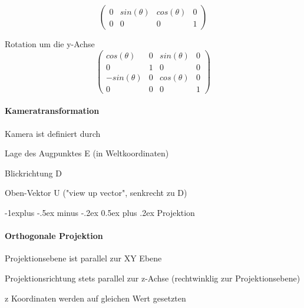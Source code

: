 \documentclass[landscape]{article}
\makeatletter
\renewcommand{\subsection}{\@startsection{subsection}{2}{0mm}%
                                {-1explus -.5ex minus -.2ex}%
                                {0.5ex plus .2ex}%
                                {\normalfont\normalsize\bfseries}}
\makeatother
\begin{document}
\begin{multicols}{3}
\begin{itemize*}
$$\begin{pmatrix}
              0 & sin(\theta) & cos(\theta)  & 0 \\
              0 & 0           & 0            & 1
            \end{pmatrix}$$
    \item Rotation um die y-Achse
          $$\begin{pmatrix}
              cos(\theta)  & 0 & sin(\theta) & 0 \\
              0            & 1 & 0           & 0 \\ 
              -sin(\theta) & 0 & cos(\theta) & 0 \\
              0            & 0 & 0           & 1
            \end{pmatrix}$$
  \end{itemize*}
  
  \paragraph{Kameratransformation}
  Kamera ist definiert durch
  \begin{itemize*}
    \item Lage des Augpunktes E (in Weltkoordinaten)
    \item Blickrichtung D
    \item Oben-Vektor U ("view up vector", senkrecht zu D)
  \end{itemize*}
  
  \subsection{Projektion}
  \paragraph{Orthogonale Projektion}
  \begin{itemize*}
    \item Projektionsebene ist parallel zur XY Ebene
    \item Projektionsrichtung stets parallel zur z-Achse (rechtwinklig zur Projektionsebene)
    \item z Koordinaten werden auf gleichen Wert gesetzten
  \end{itemize*}
  

\end{multicols}
\end{document}

